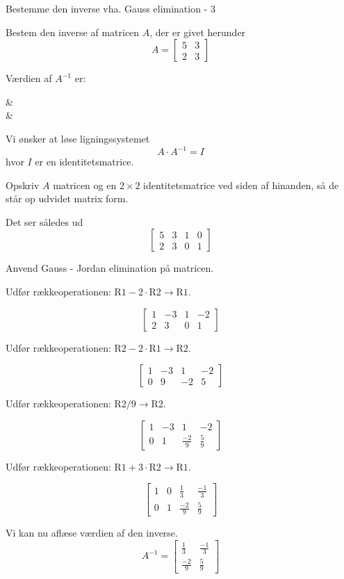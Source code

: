 \documentclass{article}
\begin{document}
\begin{exercise}{Bestemme den inverse vha. Gauss elimination - 3}

Bestem den inverse af matricen $A$, der er givet herunder
\[
A = \left[\begin{array}{cc}
5 & 3 \\
2 & 3
\end{array} \right]
\]

Værdien af $A^{-1}$ er:
\begin{answermatrix}
 &  \\
 & 
\end{answermatrix}

\hint
Vi ønsker at løse ligningssystemet
\[
A \cdot A^{-1} = I
\]
hvor $I$ er en identitetsmatrice.

\hint
Opskriv $A$ matricen og en $2 \times 2$ identitetsmatrice
ved siden af hinanden, så de står op udvidet matrix form.

\hint
Det ser således ud
\[
\left[\begin{array}{cc|cc}
5 & 3 & 1 & 0 \\
2 & 3 & 0 & 1
\end{array} \right]
\]

\hint
Anvend Gauss - Jordan elimination på matricen.

\hint
Udfør rækkeoperationen: $\text{R1} - 2 \cdot \text{R2} \to \text{R1}$.

\hint
\[
\left[\begin{array}{cc|cc}
1 & -3 & 1 & -2 \\
2 & 3 & 0 & 1
\end{array} \right]
\]

\hint
Udfør rækkeoperationen: $\text{R2} - 2 \cdot \text{R1} \to \text{R2}$.

\hint
\[
\left[\begin{array}{cc|cc}
1 & -3 & 1 & -2 \\
0 & 9 & -2 & 5
\end{array} \right]
\]

\hint
Udfør rækkeoperationen: $\text{R2} / 9 \to \text{R2}$.

\hint
\[
\left[\begin{array}{cc|cc}
1 & -3 & 1 & -2 \\
0 & 1 & \frac{-2}{9} & \frac{5}{9}
\end{array} \right]
\]

\hint
Udfør rækkeoperationen: $\text{R1} + 3 \cdot \text{R2} \to \text{R1}$.

\hint
\[
\left[\begin{array}{cc|cc}
1 & 0 & \frac{1}{3} & \frac{-1}{3} \\
0 & 1 & \frac{-2}{9} & \frac{5}{9}
\end{array} \right]
\]

\hint
Vi kan nu aflæse værdien af den inverse.
\[
A^{-1} = \left[\begin{array}{cc}
\frac{1}{3} & \frac{-1}{3} \\
\frac{-2}{9} & \frac{5}{9}
\end{array} \right]
\]


\end{exercise}
\end{document}
